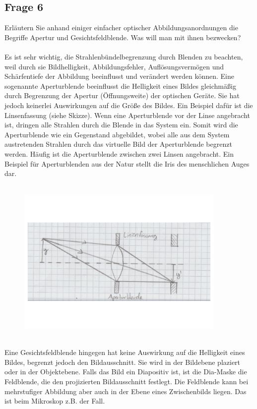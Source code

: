 \documentclass[a4paper,10pt]{scrartcl}
\begin{document}
		\subsection{Frage 6}
			Erläutern Sie anhand einiger einfacher optischer Abbildungsanordnungen die Begriffe Apertur und
			Gesichtsfeldblende. Was will man mit ihnen bezwecken?\\
			\\
			Es ist sehr wichtig, die Strahlenbündelbegrenzung durch Blenden zu beachten, weil durch sie Bildhelligkeit, Abbildungsfehler, Auflösungsvermögen und Schärfentiefe der Abbildung beeinflusst und verändert werden können. Eine sogenannte Aperturblende beeinflusst die Helligkeit eines Bildes gleichmäßig durch Begrenzung der Apertur (Öffnungsweite) der optischen Geräte. Sie hat jedoch keinerlei Auswirkungen auf die Größe des Bildes. Ein Beispiel dafür ist die Linsenfassung (siehe Skizze). Wenn eine Aperturblende vor der Linse angebracht ist, dringen alle Strahlen durch die Blende in das System ein. Somit wird die Aperturblende wie ein Gegenstand abgebildet, wobei alle aus dem System austretenden Strahlen durch das virtuelle Bild der Aperturblende begrenzt werden. Häufig ist die Aperturblende zwischen zwei Linsen angebracht. Ein Beispiel für Aperturblenden aus der Natur stellt die Iris des menschlichen Auges dar.\\
			\\
				\begin{figure}[h]
\centering
\includegraphics[width=0.9\textwidth]{./Bilder/og3}
\end{figure}
\FloatBarrier
			\\
			Eine Gesichtsfeldblende hingegen hat keine Auswirkung auf die Helligkeit eines Bildes, begrenzt jedoch den Bildausschnitt. Sie wird in der Bildebene plaziert oder in der Objektebene. Falls das Bild ein Diapositiv ist, ist die Dia-Maske die Feldblende, die den projizierten Bildausschnitt festlegt. Die Feldblende kann bei mehrstufiger Abbildung aber auch in der Ebene eines Zwischenbilds liegen. Das ist beim Mikroskop z.B. der Fall. \\
\end{document}
